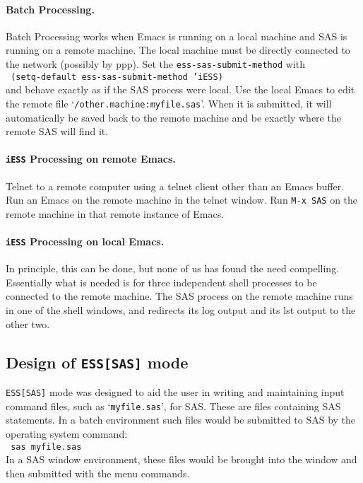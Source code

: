 \documentclass{article}
\newcommand{\stexttt}[1]{{\small\texttt{#1}}}
\newcommand{\ssf}[1]{{\small\sf{#1}}}
\newcommand{\elcode}[1]{\\{\stexttt{\hspace*{2em} #1}}\\}
\newcommand{\file}[1]{`\stexttt{#1}'}
\begin{document}

\paragraph{Batch Processing.}
Batch Processing works when Emacs is running on a local machine and SAS
is running on a remote machine.  The local machine must be directly
connected to the network (possibly by ppp).  Set the
\stexttt{ess-sas-submit-method} with \elcode{(setq-default
  ess-sas-submit-method 'iESS)} and behave exactly as if the SAS process
were local.  Use the local Emacs to edit the remote file
\file{/other.machine:myfile.sas}.  When it is submitted, it will
automatically be saved back to the remote machine and be exactly where
the remote SAS will find it.

\paragraph{\stexttt{iESS} Processing on remote Emacs.}
Telnet to a remote computer using a telnet client other than an Emacs buffer.
Run an Emacs on the remote machine in the telnet window.
Run \stexttt{M-x SAS} on the remote machine in that remote instance of Emacs.

\paragraph{\stexttt{iESS} Processing on local Emacs.}
In principle, this can be done, but none of us has found the need
compelling.  Essentially what is needed is for three independent shell
processes to be connected to the remote machine.  The SAS process on
the remote machine runs in one of the shell windows, and redirects its
log output and its lst output to the other two.

\subsection{Design of \texttt{ESS[SAS]} mode}
\label{sec:SAS:phil}

\stexttt{ESS[SAS]} mode was designed to aid the user in writing and maintaining
input command files, such as \file{myfile.sas}, for SAS.  These are files
containing SAS statements.  In a batch environment such files would be
submitted to SAS by the operating system command:
\elcode{sas myfile.sas}
In a SAS window environment, these files would be brought into the
\ssf{SAS: PROGRAM EDITOR} window and then submitted with the
\ssf{Local/Submit}
menu commands.
\end{document}
